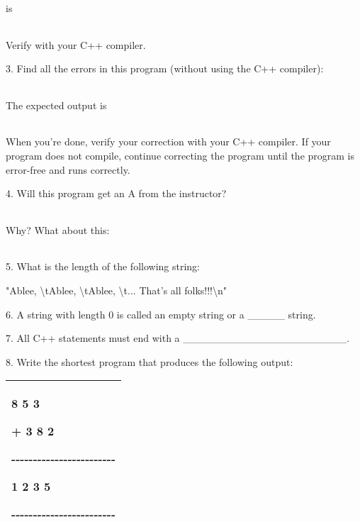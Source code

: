 \documentclass[
]{article}
\begin{document}
is

\begin{longtable}[]{@{}@{}}
\toprule
\endhead
\bottomrule
\end{longtable}

Verify with your C++ compiler.

3. Find all the errors in this program (without using the C++ compiler):

\begin{longtable}[]{@{}@{}}
\toprule
\endhead
\bottomrule
\end{longtable}

The expected output is

\begin{longtable}[]{@{}@{}}
\toprule
\endhead
\bottomrule
\end{longtable}

When you're done, verify your correction with your C++ compiler. If your
program does not compile, continue correcting the program until the
program is error-free and runs correctly.

4. Will this program get an A from the instructor?

\begin{longtable}[]{@{}@{}}
\toprule
\endhead
\bottomrule
\end{longtable}

Why? What about this:

\begin{longtable}[]{@{}@{}}
\toprule
\endhead
\bottomrule
\end{longtable}

5. What is the length of the following string:

"Ablee, \textbackslash tAblee, \textbackslash tAblee,
\textbackslash t... That's all folks!!!\textbackslash n"

6. A string with length 0 is called an empty string or a \_\_\_\_\_
string.

7. All C++ statements must end with a
\_\_\_\_\_\_\_\_\_\_\_\_\_\_\_\_\_\_\_\_\_\_.

8. Write the shortest program that produces the following output:

\begin{longtable}[]{@{}l@{}}
\toprule
\endhead
\begin{minipage}[t]{0.97\columnwidth}\raggedright
8 5 3

+ 3 8 2

-\/-\/-\/-\/-\/-\/-\/-\/-\/-\/-\/-\/-\/-\/-\/-\/-\/-\/-\/-\/-\/-\/-\/-

1 2 3 5

-\/-\/-\/-\/-\/-\/-\/-\/-\/-\/-\/-\/-\/-\/-\/-\/-\/-\/-\/-\/-\/-\/-\/-\strut
\end{minipage}\tabularnewline
\bottomrule
\end{longtable}
\end{document}
